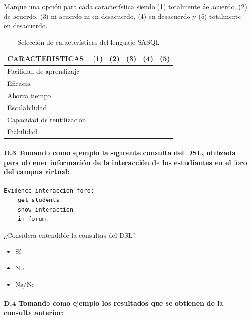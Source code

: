 Marque una opción para cada característica siendo (1) totalmente de acuerdo, (2) de acuerdo, (3) ni acuerdo ni en desacuerdo, (4) en desacuerdo y (5) totalmente en desacuerdo.

\begin{table}[H]
  \begin{center}
  \begin{tabular}{| m{5cm} | c | c | c | c | c |}
    \hline
    CARACTERISTICAS & (1) & (2) & (3) & (4) & (5) \\
    \hline
    \hline
    Facilidad de aprendizaje &  &  & & & \\
    \hline
    Eficacia &  &  & & & \\
    \hline
    Ahorra tiempo &  & & & &  \\
    \hline
    Escalabilidad &  & & & &  \\
    \hline
    Capacidad de reutilización &  &  & & &  \\
    \hline
    Fiabilidad &  &  & & & \\
    \hline
  \end{tabular}
\end{center}
\caption{Selección de características del lenguaje SASQL}
\label{tab:ap:caracteristicas:sasql}
\end{table}

\newpage

	\paragraph*{D.3 Tomando como ejemplo la siguiente consulta del DSL, utilizada para obtener información de la interacción de los estudiantes en el foro del campus virtual:}

\begin{verbatim}
Evidence interaccion_foro:  
	get students 
	show interaction 
	in forum.
\end{verbatim}


\begin{mdframed}[style=cuestionarioST]
	¿Considera entendible la consultas del DSL?
			\begin{itemize}
				\item Sí
				\item No
				\item Ns/Nc
			\end{itemize}
\end{mdframed}


	\paragraph*{D.4 Tomando como ejemplo los resultados que se obtienen de la consulta anterior:}

